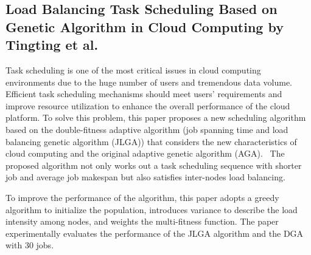 \subsection{Load Balancing Task Scheduling Based on Genetic Algorithm in Cloud Computing by Tingting et al.}

Task scheduling is one of the most critical issues in cloud computing environments due to the huge number of users and tremendous data volume. 
Efficient task scheduling mechanisms should meet users' requirements and improve resource utilization to enhance the overall performance of the cloud platform. 
To solve this problem, this paper proposes a new scheduling algorithm based on the double-fitness adaptive algorithm 
(job spanning time and load balancing genetic algorithm (JLGA)) that considers the new characteristics of cloud computing and the original adaptive genetic algorithm (AGA).~\cite{jakobovic1999adaptive}
The proposed algorithm not only works out a task scheduling sequence with shorter job and average job makespan but also satisfies inter-nodes load balancing.

To improve the performance of the algorithm, this paper adopts a greedy algorithm to initialize the population, introduces variance to describe the load intensity among nodes, 
and weights the multi-fitness function. The paper experimentally evaluates the performance of the JLGA algorithm and the DGA with 30 jobs. 


